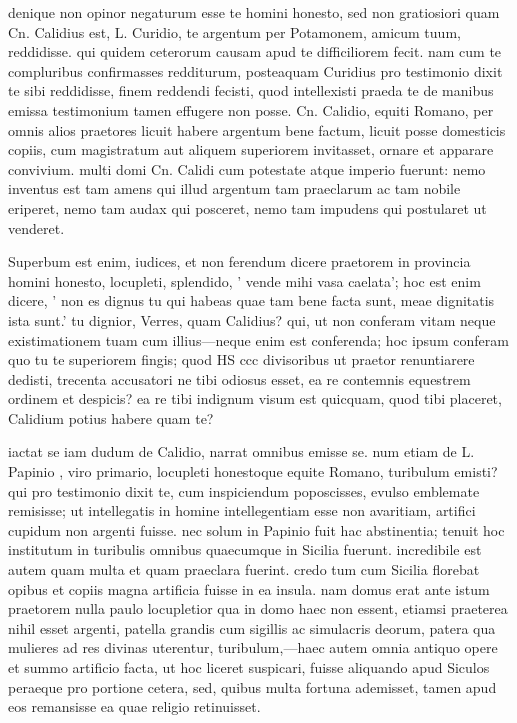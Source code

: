  denique non opinor negaturum esse te homini honesto, sed non gratiosiori quam Cn. Calidius est, L. Curidio, te argentum per Potamonem, amicum tuum, reddidisse. qui quidem ceterorum causam apud te difficiliorem fecit. nam cum te compluribus confirmasses redditurum, posteaquam Curidius pro testimonio dixit te sibi reddidisse, finem reddendi fecisti, quod intellexisti praeda te de manibus emissa testimonium tamen effugere non posse. Cn. Calidio, equiti Romano, per omnis alios praetores licuit habere argentum bene factum, licuit posse domesticis copiis, cum magistratum aut aliquem superiorem invitasset, ornare et apparare convivium. multi domi Cn. Calidi cum potestate atque imperio fuerunt: nemo inventus est tam amens qui illud argentum tam praeclarum ac tam nobile eriperet, nemo tam audax qui posceret, nemo tam impudens qui postularet ut venderet.

 Superbum est enim, iudices, et non ferendum dicere praetorem in provincia homini honesto, locupleti, splendido, ' vende mihi vasa caelata'; hoc est enim dicere, ' non es dignus tu qui habeas quae tam bene facta sunt, meae dignitatis ista sunt.' tu dignior, Verres, quam Calidius? qui, ut non conferam vitam neque existimationem tuam cum illius—neque enim est conferenda; hoc ipsum conferam quo tu te superiorem fingis; quod HS ccc divisoribus ut praetor renuntiarere dedisti, trecenta accusatori ne tibi odiosus esset, ea re contemnis equestrem ordinem et despicis? ea re tibi indignum visum est quicquam, quod tibi placeret, Calidium potius habere quam te?

 iactat se iam dudum de Calidio, narrat omnibus emisse se. num etiam de L. Papinio , viro primario, locupleti honestoque equite Romano, turibulum emisti? qui pro testimonio dixit te, cum inspiciendum poposcisses, evulso emblemate remisisse; ut intellegatis in homine intellegentiam esse non avaritiam, artifici cupidum non argenti fuisse. nec solum in Papinio fuit hac abstinentia; tenuit hoc institutum in turibulis omnibus quaecumque in Sicilia fuerunt. incredibile est autem quam multa et quam praeclara fuerint. credo tum cum Sicilia florebat opibus et copiis magna artificia fuisse in ea insula. nam domus erat ante istum praetorem nulla paulo locupletior qua in domo haec non essent, etiamsi praeterea nihil esset argenti, patella grandis cum sigillis ac simulacris deorum, patera qua mulieres ad res divinas uterentur, turibulum,—haec autem omnia antiquo opere et summo artificio facta, ut hoc liceret suspicari, fuisse aliquando apud Siculos peraeque pro portione cetera, sed, quibus multa fortuna ademisset, tamen apud eos remansisse ea quae religio retinuisset.

